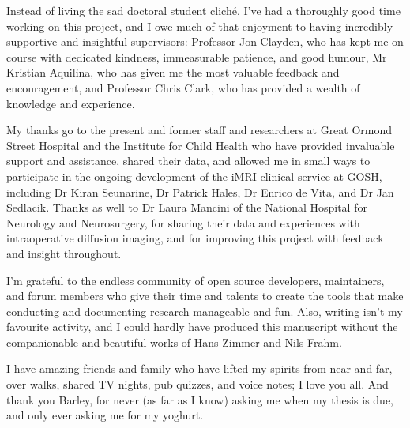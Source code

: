 \begin{acknowledgements}
  Instead of living the sad doctoral student cliché, I've had a thoroughly good time working on this project, and I owe much of that enjoyment to having incredibly supportive and insightful supervisors: Professor Jon Clayden, who has kept me on course with dedicated kindness, immeasurable patience, and good humour, Mr Kristian Aquilina, who has given me the most valuable feedback and encouragement, and Professor Chris Clark, who has provided a wealth of knowledge and experience.

  My thanks go to the present and former staff and researchers at Great Ormond Street Hospital and the Institute for Child Health who have provided invaluable support and assistance, shared their data, and allowed me in small ways to participate in the ongoing development of the iMRI clinical service at GOSH, including Dr Kiran Seunarine, Dr Patrick Hales, Dr Enrico de Vita, and Dr Jan Sedlacik. Thanks as well to Dr Laura Mancini of the National Hospital for Neurology and Neurosurgery, for sharing their data and experiences with intraoperative diffusion imaging, and for improving this project with feedback and insight throughout.

  I'm grateful to the endless community of open source developers, maintainers, and forum members who give their time and talents to create the tools that make conducting and documenting research manageable and fun. Also, writing isn't my favourite activity, and I could hardly have produced this manuscript without the companionable and beautiful works of Hans Zimmer and Nils Frahm.

  I have amazing friends and family who have lifted my spirits from near and far, over walks, shared TV nights, pub quizzes, and voice notes; I love you all. And thank you Barley, for never (as far as I know) asking me when my thesis is due, and only ever asking me for my yoghurt.
\end{acknowledgements}



\tableofcontents
\setcounter{tocdepth}{1}
\listoffigures
\listoftables
{
\setlength{\glsdescwidth}{0.8\linewidth}
\printglossary[type=\acronymtype,title={List of Abbreviations}]
}
